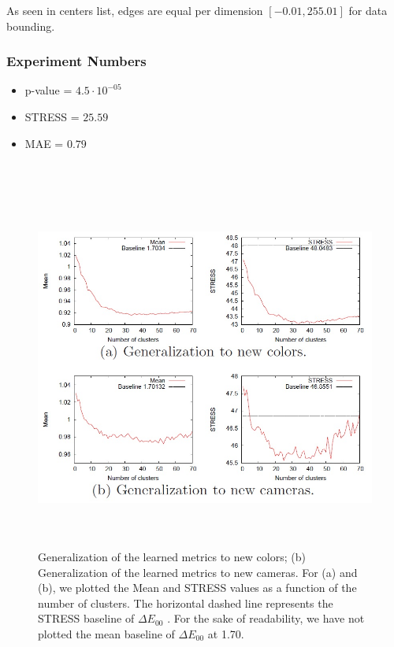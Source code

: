 	As seen in centers list, edges are equal per dimension $[-0.01 , 255.01]$ for data bounding.\\
	
	\subsubsection{Experiment Numbers}	
	\begin{itemize}
	\item 	p-value = $4.5 \cdot 10 ^{-05}$
	\item 	STRESS = $25.59$
	\item 	MAE = $0.79$
	
	\end{itemize}


\\


\begin{figure}[h] \label{original paper results}
			\includegraphics[width=\linewidth,height=12cm,keepaspectratio]{Figures/original_paper_results}
			\caption[orig res]
			{Generalization of the learned metrics to new colors; (b) Generalization of
			the learned metrics to new cameras. For (a) and (b), we plotted the Mean and STRESS
			values as a function of the number of clusters. The horizontal dashed line represents
			the STRESS baseline of $\Delta E_{00}$ . For the sake of readability, we have not plotted the
			mean baseline of $\Delta E_{00}$ at 1.70.}
\end{figure}

